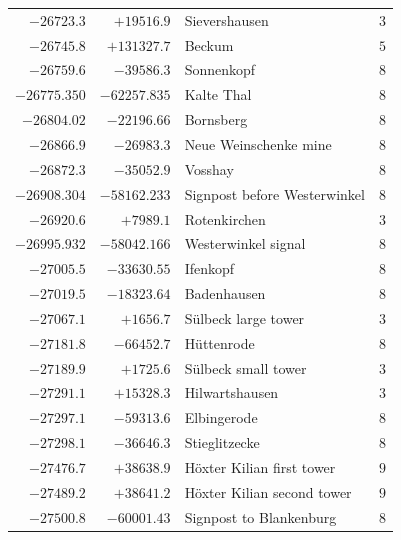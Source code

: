 \begin{center}
\begin{tabular}{r|r|p{170pt}|r}
\(-26723.3\)&\(+19516.9\)&Sievershausen&\(3\)\\
\(-26745.8\)&\(+131327.7\)&Beckum&\(5\)\\
\(-26759.6\)&\(-39586.3\)&Sonnenkopf&\(8\)\\
\(-26775.350\)&\(-62257.835\)&Kalte Thal&\(8\)\\
\(-26804.02\)&\(-22196.66\)&Bornsberg&\(8\)\\
\(-26866.9\)&\(-26983.3\)&Neue Weinschenke mine&\(8\)\\
\(-26872.3\)&\(-35052.9\)&Vosshay&\(8\)\\
\(-26908.304\)&\(-58162.233\)&Signpost before Westerwinkel&\(8\)\\
\(-26920.6\)&\(+7989.1\)&Rotenkirchen&\(3\)\\
\(-26995.932\)&\(-58042.166\)&Westerwinkel signal&\(8\)\\
\(-27005.5\)&\(-33630.55\)&Ifenkopf&\(8\)\\
\(-27019.5\)&\(-18323.64\)&Badenhausen&\(8\)\\
\(-27067.1\)&\(+1656.7\)&Sülbeck large tower&\(3\)\\
\(-27181.8\)&\(-66452.7\)&Hüttenrode&\(8\)\\
\(-27189.9\)&\(+1725.6\)&Sülbeck small tower&\(3\)\\
\(-27291.1\)&\(+15328.3\)&Hilwartshausen&\(3\)\\
\(-27297.1\)&\(-59313.6\)&Elbingerode&\(8\)\\
\(-27298.1\)&\(-36646.3\)&Stieglitzecke&\(8\)\\
\(-27476.7\)&\(+38638.9\)&Höxter Kilian first tower&\(9\)\\
\(-27489.2\)&\(+38641.2\)&Höxter Kilian second tower&\(9\)\\
\(-27500.8\)&\(-60001.43\)&Signpost to Blankenburg&\(8\)\\
\hline\end{tabular}\endgroup\end{center}
